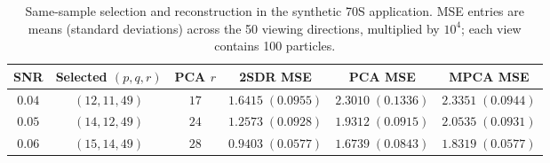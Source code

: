 \begin{table}[tbp]
\centering
\small
\caption{Same-sample selection and reconstruction in the
synthetic 70S application.  MSE entries are means (standard deviations)
across the 50 viewing directions, multiplied by $10^4$; each view
contains 100 particles.}
\label{tab:70s}
\begin{tabular}{cccccc}
\toprule
SNR & Selected $(p,q,r)$ & PCA $r$ & 2SDR MSE & PCA MSE & MPCA MSE\\
\midrule
$0.04$ & $(12,11,49)$ & $17$ & $1.6415\;(0.0955)$ & $2.3010\;(0.1336)$ & $2.3351\;(0.0944)$\\
$0.05$ & $(14,12,49)$ & $24$ & $1.2573\;(0.0928)$ & $1.9312\;(0.0915)$ & $2.0535\;(0.0931)$\\
$0.06$ & $(15,14,49)$ & $28$ & $0.9403\;(0.0577)$ & $1.6739\;(0.0843)$ & $1.8319\;(0.0577)$\\
\bottomrule
\end{tabular}
\end{table}
